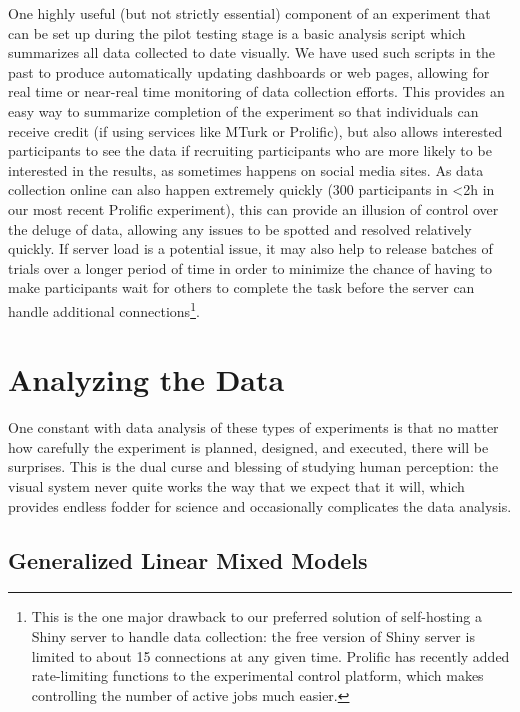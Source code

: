 \documentclass[
  10pt,
  letterpaper,
  DIV=11,
  numbers=noendperiod]{scrartcl}
\begin{document}
One highly useful (but not strictly essential) component of an
experiment that can be set up during the pilot testing stage is a basic
analysis script which summarizes all data collected to date visually. We
have used such scripts in the past to produce automatically updating
dashboards or web pages, allowing for real time or near-real time
monitoring of data collection efforts. This provides an easy way to
summarize completion of the experiment so that individuals can receive
credit (if using services like MTurk or Prolific), but also allows
interested participants to see the data if recruiting participants who
are more likely to be interested in the results, as sometimes happens on
social media sites. As data collection online can also happen extremely
quickly (300 participants in \textless2h in our most recent Prolific
experiment), this can provide an illusion of control over the deluge of
data, allowing any issues to be spotted and resolved relatively quickly.
If server load is a potential issue, it may also help to release batches
of trials over a longer period of time in order to minimize the chance
of having to make participants wait for others to complete the task
before the server can handle additional connections\footnote{This is the
  one major drawback to our preferred solution of self-hosting a Shiny
  server to handle data collection: the free version of Shiny server is
  limited to about 15 connections at any given time. Prolific has
  recently added rate-limiting functions to the experimental control
  platform, which makes controlling the number of active jobs much
  easier.}.

\section{Analyzing the Data}\label{sec-analysis}

One constant with data analysis of these types of experiments is that no
matter how carefully the experiment is planned, designed, and executed,
there will be surprises. This is the dual curse and blessing of studying
human perception: the visual system never quite works the way that we
expect that it will, which provides endless fodder for science and
occasionally complicates the data analysis.

\subsection{Generalized Linear Mixed
Models}\label{generalized-linear-mixed-models}
\end{document}
